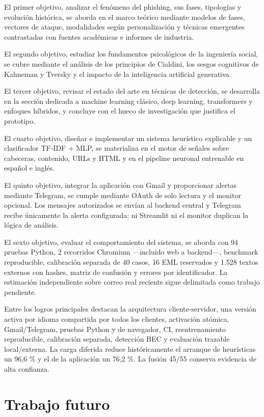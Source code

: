 \documentclass[11pt,a4paper,oneside]{report}
\begin{document}
El primer objetivo, analizar el fenómeno del phishing, sus fases, tipologías y evolución histórica, se aborda en el marco teórico mediante modelos de fases, vectores de ataque, modalidades según personalización y técnicas emergentes contrastadas con fuentes académicas e informes de industria.

El segundo objetivo, estudiar los fundamentos psicológicos de la ingeniería social, se cubre mediante el análisis de los principios de Cialdini, los sesgos cognitivos de Kahneman y Tversky y el impacto de la inteligencia artificial generativa.

El tercer objetivo, revisar el estado del arte en técnicas de detección, se desarrolla en la sección dedicada a machine learning clásico, deep learning, transformers y enfoques híbridos, y concluye con el hueco de investigación que justifica el prototipo.

El cuarto objetivo, diseñar e implementar un sistema heurístico explicable y un clasificador TF-IDF + MLP, se materializa en el motor de señales sobre cabeceras, contenido, URLs y HTML y en el pipeline neuronal entrenable en español e inglés.

El quinto objetivo, integrar la aplicación con Gmail y proporcionar alertas mediante Telegram, se cumple mediante OAuth de solo lectura y el monitor opcional. Los mensajes autorizados se envían al backend central y Telegram recibe únicamente la alerta configurada; ni Streamlit ni el monitor duplican la lógica de análisis.

El sexto objetivo, evaluar el comportamiento del sistema, se aborda con 94 pruebas Python, 2 recorridos Chromium ---incluido web a backend---, benchmark reproducible, calibración separada de 40 casos, 16 EML reservados y 1.528 textos externos con hashes, matriz de confusión y errores por identificador. La estimación independiente sobre correo real reciente sigue delimitada como trabajo pendiente.

Entre los logros principales destacan la arquitectura cliente-servidor, una versión activa por idioma compartida por todos los clientes, activación atómica, Gmail/Telegram, pruebas Python y de navegador, CI, reentrenamiento reproducible, calibración separada, detección BEC y evaluación trazable local/externa. La carga diferida reduce históricamente el arranque de heurísticas un 96,6 \% y el de la aplicación un 76,2 \%. La fusión 45/55 conserva evidencia de alta confianza.

\section{Trabajo futuro}
\end{document}
